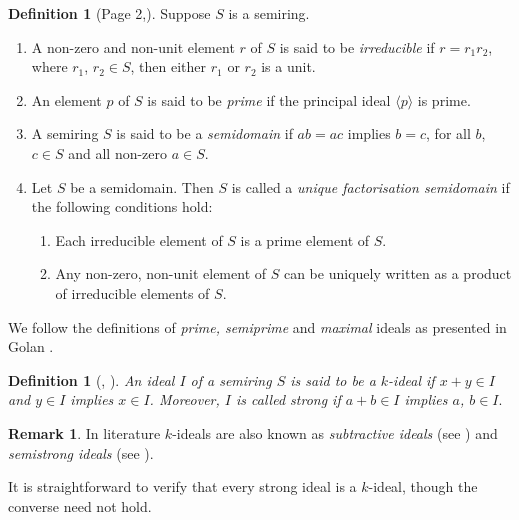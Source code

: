 \documentclass[11pt,english]{amsart}
\theoremstyle{definition}
\newtheorem{definition}[theorem]{Definition}
\newtheorem{remark}[theorem]{Remark}
\numberwithin{equation}{section}
\begin{document}
\begin{definition}[Page 2,\cite{Nasehpour19}] Suppose $S$ is a semiring.
\begin{enumerate}
\item A non-zero and non-unit element $r$ of  $S$ is said to be \emph{irreducible} if $r=r_1r_2$, where $r_1$, $r_2\in S$, then either $r_1$ or $r_2$ is a unit.

\item  An element $p$ of  $S$ is said to be \emph{prime} if the principal ideal $\langle p \rangle$ is prime.
        
\item A semiring $S$ is said to be a \emph{semidomain} if $ab=ac$ implies $b=c$, for all $b$, $c \in S$ and all non-zero $a \in S$.
        
        \item Let $S$ be a semidomain. Then $S$ is called a \emph{unique factorisation semidomain} if the following conditions hold:
        \begin{enumerate}
            \item Each irreducible element of $S$ is a prime element of $S$.
            \item Any non-zero, non-unit element of $S$ can be uniquely written as a product of irreducible elements of $S$.
        \end{enumerate}
    \end{enumerate}
\end{definition}

We follow the definitions of \emph{prime, semiprime} and \emph{maximal} ideals as presented in Golan \cite[Chapter 6, Chapter 7]{Golan}.

\begin{definition}[\cite{Henriksen58}, \cite{Golan}]\label{Def: k-ideal and strong ideal}
    \textit{An ideal $I$ of a semiring $S$ is said to be a \emph{$k$-ideal} if $x+y\in I$ and $y\in I$ implies $x\in I$. Moreover, $I$ is called \emph{strong} if $a+b\in I$ implies $a$, $b\in I$}.
\end{definition} 

\begin{remark}
    In literature $k$-ideals are also known as \emph{subtractive ideals} (see \cite[Chapter 6]{Golan}) and \emph{semistrong ideals} (see \cite[Section 1]{Chermynkh12}).
\end{remark}

It is straightforward to verify that every strong ideal is a $k$-ideal, though the converse need not hold. 
\end{document}
